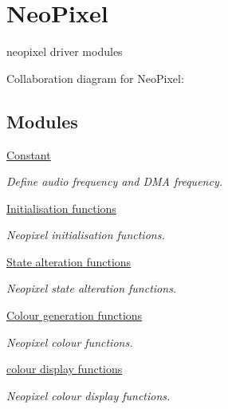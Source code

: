 \hypertarget{group___neo_pixel}{}\section{Neo\+Pixel}
\label{group___neo_pixel}


neopixel driver modules  


Collaboration diagram for Neo\+Pixel\+:
\subsection*{Modules}
\begin{DoxyCompactItemize}
\item 
\hyperlink{group___constant}{Constant}
\begin{DoxyCompactList}\small\item\em Define audio frequency and D\+MA frequency. \end{DoxyCompactList}\item 
\hyperlink{group___neo_pixel___init}{Initialisation functions}
\begin{DoxyCompactList}\small\item\em Neopixel initialisation functions. \end{DoxyCompactList}\item 
\hyperlink{group___neo_pixel___state}{State alteration functions}
\begin{DoxyCompactList}\small\item\em Neopixel state alteration functions. \end{DoxyCompactList}\item 
\hyperlink{group___neo_pixel___colour}{Colour generation functions}
\begin{DoxyCompactList}\small\item\em Neopixel colour functions. \end{DoxyCompactList}\item 
\hyperlink{group___neo_pixel___display}{colour display functions}
\begin{DoxyCompactList}\small\item\em Neopixel colour display functions. \end{DoxyCompactList}\end{DoxyCompactItemize}
